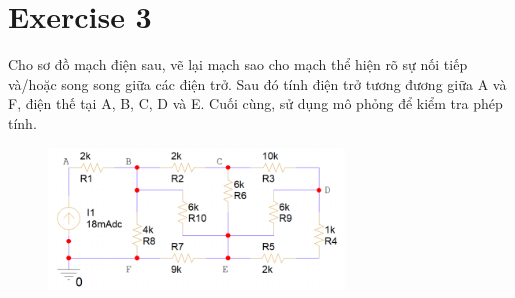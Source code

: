 \section{Exercise 3}
Cho sơ đồ mạch điện sau, vẽ lại mạch sao cho mạch thể hiện rõ sự nối tiếp và/hoặc song song giữa các điện trở. Sau đó tính điện trở tương đương giữa A và F, điện thế tại A, B, C, D và E. Cuối cùng, sử dụng mô phỏng để kiểm tra phép tính.
\begin{figure}[!htbp]
    \centering
    \includegraphics[width=0.7\textwidth]{graphics/ex3/f2.PNG}
\end{figure}